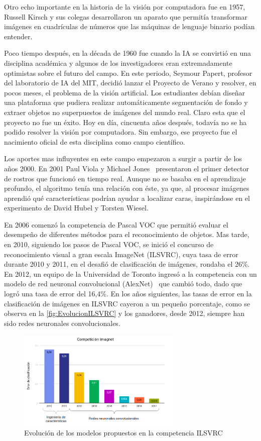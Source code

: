 Otro echo importante en la historia de la visión por computadora fue en 1957, Russell Kirsch y sus colegas desarrollaron un aparato que permitía transformar imágenes en cuadrículas de números que las máquinas de lenguaje binario podían entender. 

Poco tiempo después, en la década de 1960 fue cuando la IA se convirtió en una disciplina académica y algunos de los investigadores eran extremadamente optimistas sobre el futuro del campo. En este periodo, Seymour Papert, profesor del laboratorio de IA del MIT, decidió lanzar el Proyecto de Verano y resolver, en pocos meses, el problema de la visión artificial. Los estudiantes debían diseñar una plataforma que pudiera realizar automáticamente segmentación de fondo y extraer objetos no superpuestos de imágenes del mundo real. Claro esta que el proyecto no fue un éxito.  Hoy en día, cincuenta años después, todavía no se ha podido resolver la visión por computadora. Sin embargo, ese proyecto fue el nacimiento oficial de esta disciplina como campo científico. 

Los aportes mas influyentes en este campo empezaron a surgir a partir de los años 2000. En 2001 Paul Viola y Michael Jones~\cite{viola2001rapid} presentaron el primer detector de rostros que funcionó en tiempo real. Aunque no se basaba en el aprendizaje profundo, el algoritmo tenía una relación con éste, ya que, al procesar imágenes aprendió qué características podrían ayudar a localizar caras, inspirándose en el experimento de David Hubel y Torsten Wiesel. 

En 2006 comenzó la competencia de Pascal VOC que permitió evaluar el desempeño de diferentes métodos para el reconocimiento de objetos. Mas tarde, en 2010, siguiendo los pasos de Pascal VOC, se inició el concurso de reconocimiento visual a gran escala ImageNet (ILSVRC), cuya tasa de error durante 2010 y 2011, en el desafió de clasificación de imágenes, rondaba el 26\%.  En 2012, un equipo de la Universidad de Toronto ingresó a la competencia con un modelo de red neuronal convolucional (AlexNet)~\cite{krizhevsky2012imagenet} que cambió todo, dado que logró una tasa de error del 16,4\%. En los años siguientes, las tasas de error en la clasificación de imágenes en ILSVRC cayeron a un pequeño porcentaje, como se observa en la \autoref{fig:EvolucionILSVRC} y los ganadores, desde 2012, siempre han sido redes neuronales convolucionales.

\begin{figure}[H]
	\centering
	\includegraphics[width=0.7\textwidth]{img/imgnet-grafico.png}
	\caption{Evolución de los modelos propuestos en la competencia ILSVRC}
	\label{fig:EvolucionILSVRC}
\end{figure}

